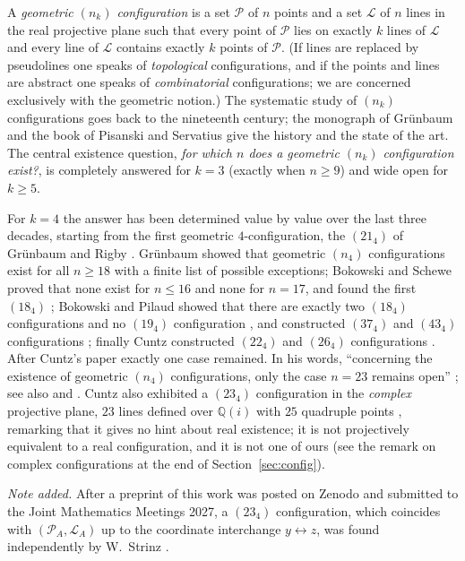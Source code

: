 \documentclass[11pt]{article}
\theoremstyle{plain}
\theoremstyle{definition}
\newcommand{\QQ}{\mathbb{Q}}
\newcommand{\cP}{\mathcal{P}}
\newcommand{\cL}{\mathcal{L}}
\begin{document}
A \emph{geometric $(n_k)$ configuration} is a set $\cP$ of $n$ points and a set $\cL$ of $n$ lines in the real projective plane such that every point of $\cP$ lies on exactly $k$ lines of $\cL$ and every line of $\cL$ contains exactly $k$ points of $\cP$.  (If lines are replaced by pseudolines one speaks of \emph{topological} configurations, and if the points and lines are abstract one speaks of \emph{combinatorial} configurations; we are concerned exclusively with the geometric notion.)  The systematic study of $(n_k)$ configurations goes back to the nineteenth century; the monograph of Gr\"unbaum \cite{Gru09} and the book of Pisanski and Servatius \cite{PS13} give the history and the state of the art.  The central existence question, \emph{for which $n$ does a geometric $(n_k)$ configuration exist?}, is completely answered for $k=3$ (exactly when $n\ge 9$) and wide open for $k\ge 5$.

For $k=4$ the answer has been determined value by value over the last three decades, starting from the first geometric $4$-configuration, the $(21_4)$ of Gr\"unbaum and Rigby \cite{GR90}.  Gr\"unbaum \cite{Gru00a,Gru00,Gru02,Gru06} showed that geometric $(n_4)$ configurations exist for all $n\ge 18$ with a finite list of possible exceptions; Bokowski and Schewe proved that none exist for $n\le 16$ \cite{BS05} and none for $n=17$, and found the first $(18_4)$ \cite{BS13}; Bokowski and Pilaud showed that there are exactly two $(18_4)$ configurations and no $(19_4)$ configuration \cite{BP15}, and constructed $(37_4)$ and $(43_4)$ configurations \cite{BP16}; finally Cuntz constructed $(22_4)$ and $(26_4)$ configurations \cite{Cun18}.  After Cuntz's paper exactly one case remained.  In his words, ``concerning the existence of geometric $(n_4)$ configurations, only the case $n=23$ remains open'' \cite{Cun18}; see also \cite[\S1]{GP21} and \cite{BGP24}.  Cuntz also exhibited a $(23_4)$ configuration in the \emph{complex} projective plane, $23$ lines defined over $\QQ(i)$ with $25$ quadruple points \cite[\S2.3]{Cun18}, remarking that it gives no hint about real existence; it is not projectively equivalent to a real configuration, and it is not one of ours (see the remark on complex configurations at the end of Section~\ref{sec:config}).

\emph{Note added.}  After a preprint of this work was posted on Zenodo \cite{Lu26pre} and submitted to the Joint Mathematics Meetings 2027, a $(23_4)$ configuration, which coincides with $(\cP_A,\cL_A)$ up to the coordinate interchange $y\leftrightarrow z$, was found independently by W.~Strinz \cite{Str26}.
\end{document}
